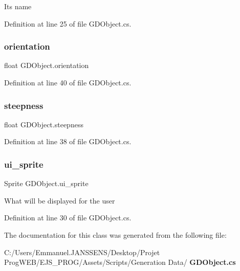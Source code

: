 Its name 



Definition at line 25 of file G\+D\+Object.\+cs.

\mbox{\label{class_g_d_object_ae1830ca3f3fe13b9b3bb940b11867a1a}} 
\subsubsection{orientation}
{\footnotesize\ttfamily float G\+D\+Object.\+orientation}



Definition at line 40 of file G\+D\+Object.\+cs.

\mbox{\label{class_g_d_object_ac85abe5c6a59a934e7216183f59b809b}} 
\subsubsection{steepness}
{\footnotesize\ttfamily float G\+D\+Object.\+steepness}



Definition at line 38 of file G\+D\+Object.\+cs.

\mbox{\label{class_g_d_object_afcdc6aa9e61318baf3e161a47f6b6bdb}} 
\subsubsection{ui\+\_\+sprite}
{\footnotesize\ttfamily Sprite G\+D\+Object.\+ui\+\_\+sprite}



What will be displayed for the user 



Definition at line 30 of file G\+D\+Object.\+cs.



The documentation for this class was generated from the following file\+:\begin{DoxyCompactItemize}
\item 
C\+:/\+Users/\+Emmanuel.\+J\+A\+N\+S\+S\+E\+N\+S/\+Desktop/\+Projet Prog\+W\+E\+B/\+E\+J\+S\+\_\+\+P\+R\+O\+G/\+Assets/\+Scripts/\+Generation Data/\textbf{ G\+D\+Object.\+cs}\end{DoxyCompactItemize}
